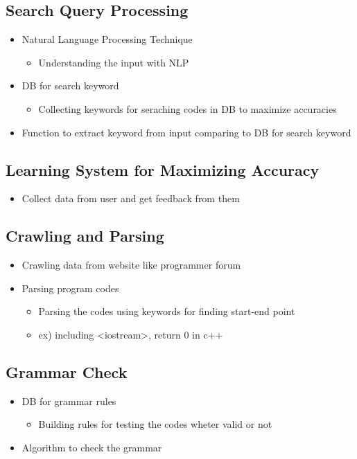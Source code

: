 \documentclass[conference]{IEEEtran}
\begin{document}
\subsection{Search Query Processing}
\begin{itemize}
  \item Natural Language Processing Technique
  \begin{itemize}
    \item Understanding the input with NLP
  \end{itemize}
  \item DB for search keyword
  \begin{itemize}
    \item Collecting keywords for seraching codes in DB to maximize accuracies
  \end{itemize}
  \item Function to extract keyword from input comparing to DB for search keyword
\end{itemize}
\textit{ }

\subsection{Learning System for Maximizing Accuracy}
\begin{itemize}
  \item Collect data from user and get feedback from them
\end{itemize}
\textit{ }

\subsection{Crawling and Parsing}
\begin{itemize}
  \item Crawling data from website like programmer forum
  \item Parsing program codes
  \begin{itemize}
    \item Parsing the codes using keywords for finding start-end point
    \item ex) including <iostream>, return 0 in c++
  \end{itemize}
\end{itemize}
\textit{ }

\subsection{Grammar Check}
\begin{itemize}
  \item DB for grammar rules
  \begin{itemize}
    \item Building rules for testing the codes wheter valid or not
  \end{itemize}
  \item Algorithm to check the grammar
\end{itemize}
\textit{ }
\end{document}
